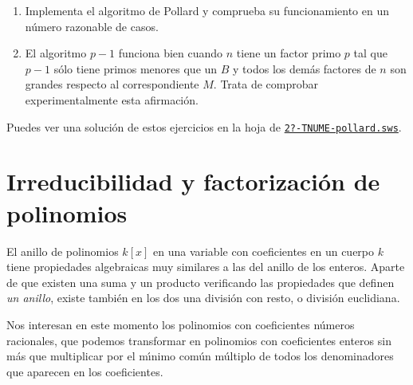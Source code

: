 \bigskip

\pagebreak[3]

\begin{ejer}
\begin{enumerate} 
\item Implementa el algoritmo de Pollard y comprueba su funcionamiento en un 
n\'umero razonable de casos.

\item El algoritmo $p-1$ funciona bien  cuando $n$ tiene un
factor primo $p$ tal que $p-1$ s\'olo tiene primos menores que un $B$ y todos
los dem\'as factores de $n$ son grandes respecto al correspondiente $M.$ Trata 
de 
comprobar experimentalmente esta afirmaci\'on.
\end{enumerate}
\end{ejer}

Puedes ver una soluci\'on de estos ejercicios en la hoja de {\sage}
\href{http://sage.mat.uam.es:8888/home/pub/?/}{\tt 2?-TNUME-pollard.sws}.








\section{Irreducibilidad y factorizaci\'on de polinomios}




El anillo de polinomios $k[x]$ en una variable con coeficientes en un cuerpo $k$
tiene propiedades algebraicas muy similares a las del anillo de los enteros.
Aparte de que existen una suma y un producto verificando las propiedades que
definen {\itshape un anillo}, existe tambi\'en en los dos una divisi\'on con
resto, o divisi\'on euclidiana. 


Nos interesan en este momento los polinomios con coeficientes n\'umeros
racionales, que podemos transformar en polinomios con coeficientes enteros sin
m\'as que multiplicar por el m\'{\i}nimo com\'un m\'ultiplo de todos los
denominadores que aparecen en los coeficientes. 



